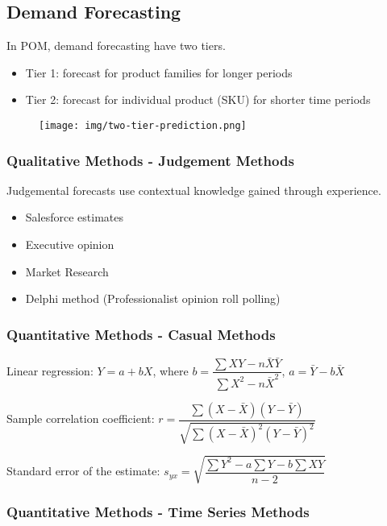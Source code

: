 \documentclass{article}
\begin{document}
\subsection{Demand Forecasting}

In POM, demand forecasting have two tiers.
\begin{itemize}
	\item Tier 1: forecast for product families for longer periods
	\item Tier 2: forecast for individual product (SKU) for shorter time periods
\end{itemize}

\begin{figure}[H]
	\centering
	\texttt{[image: img/two-tier-prediction.png]}
\end{figure}

\subsubsection{Qualitative Methods - Judgement Methods}

Judgemental forecasts use contextual knowledge gained through experience.

\begin{itemize}
	\item Salesforce estimates
	\item Executive opinion
	\item Market Research
	\item Delphi method (Professionalist opinion roll polling)
\end{itemize}

\subsubsection{Quantitative Methods - Casual Methods}

Linear regression: $Y = a + bX$, where $b = \dfrac{
		\sum XY - n\bar{X}\bar{Y}
	}{
		\sum X^2 - n\bar{X}^2
	}$, $a= \bar{Y} - b \bar{X}$

Sample correlation coefficient: $r = \dfrac{
		\sum (X - \bar{X})(Y - \bar{Y})
	}{
		\sqrt{
			\sum (X - \bar{X})^2(Y - \bar{Y})^2
		}
	}$

Standard error of the estimate: $s_{yx} =
	\sqrt{
		\dfrac{
			\sum Y^2 - a \sum Y - b \sum XY
		}{
			n - 2
		}
	}$

\subsubsection{Quantitative Methods - Time Series Methods}
\end{document}
